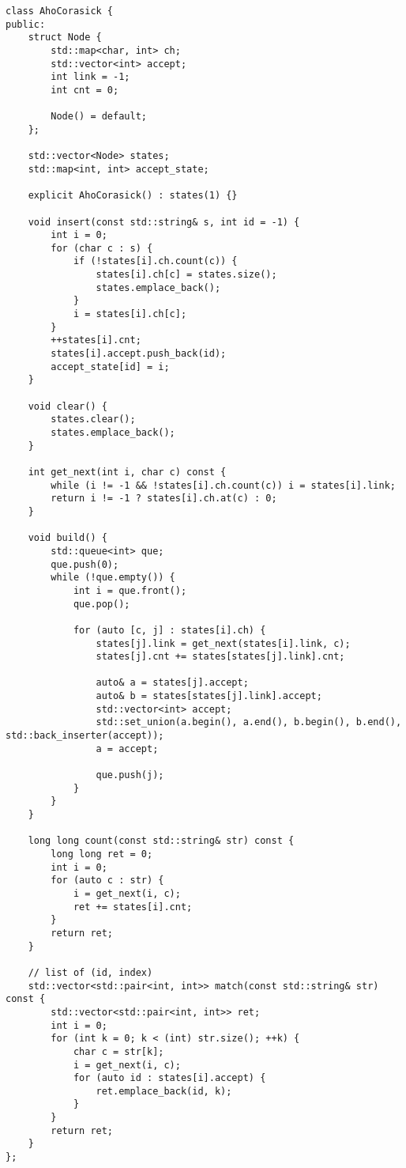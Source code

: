 \begin{lstlisting}
class AhoCorasick {
public:
    struct Node {
        std::map<char, int> ch;
        std::vector<int> accept;
        int link = -1;
        int cnt = 0;

        Node() = default;
    };

    std::vector<Node> states;
    std::map<int, int> accept_state;

    explicit AhoCorasick() : states(1) {}

    void insert(const std::string& s, int id = -1) {
        int i = 0;
        for (char c : s) {
            if (!states[i].ch.count(c)) {
                states[i].ch[c] = states.size();
                states.emplace_back();
            }
            i = states[i].ch[c];
        }
        ++states[i].cnt;
        states[i].accept.push_back(id);
        accept_state[id] = i;
    }

    void clear() {
        states.clear();
        states.emplace_back();
    }

    int get_next(int i, char c) const {
        while (i != -1 && !states[i].ch.count(c)) i = states[i].link;
        return i != -1 ? states[i].ch.at(c) : 0;
    }

    void build() {
        std::queue<int> que;
        que.push(0);
        while (!que.empty()) {
            int i = que.front();
            que.pop();

            for (auto [c, j] : states[i].ch) {
                states[j].link = get_next(states[i].link, c);
                states[j].cnt += states[states[j].link].cnt;

                auto& a = states[j].accept;
                auto& b = states[states[j].link].accept;
                std::vector<int> accept;
                std::set_union(a.begin(), a.end(), b.begin(), b.end(), std::back_inserter(accept));
                a = accept;

                que.push(j);
            }
        }
    }

    long long count(const std::string& str) const {
        long long ret = 0;
        int i = 0;
        for (auto c : str) {
            i = get_next(i, c);
            ret += states[i].cnt;
        }
        return ret;
    }

    // list of (id, index)
    std::vector<std::pair<int, int>> match(const std::string& str) const {
        std::vector<std::pair<int, int>> ret;
        int i = 0;
        for (int k = 0; k < (int) str.size(); ++k) {
            char c = str[k];
            i = get_next(i, c);
            for (auto id : states[i].accept) {
                ret.emplace_back(id, k);
            }
        }
        return ret;
    }
};

\end{lstlisting}

